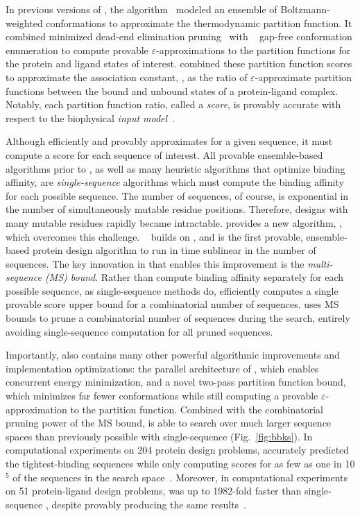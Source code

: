 \def\multisequencebound{MS\xspace}
\def\msbound{\multisequencebound}


\newcommand{\cut}[1]{}

In previous versions of \osprey, the \ks algorithm~\cite{K*} modeled an ensemble of Boltzmann-weighted conformations to approximate the thermodynamic partition function. It combined minimized dead-end elimination pruning~\cite{DEE} with \as~\cite{DEE,A*} gap-free conformation enumeration to compute provable $\varepsilon$-approximations to the partition functions for the protein and ligand states of interest. \ks combined these partition function scores to approximate the association constant, \ka, as the ratio of $\varepsilon$-approximate partition functions between the bound and unbound states of a protein-ligand complex. Notably, each partition function ratio, called a \ks \emph{score}, is provably accurate with respect to the biophysical \emph{input model}~\cite{K*,minDEE,iMinDEE}. 

Although \ks efficiently and provably approximates \ka for a given sequence, it must compute a \ks score for each sequence of interest. All provable ensemble-based algorithms prior to \bbks, as well as many heuristic algorithms that optimize binding affinity, are \emph{single-sequence} algorithms which must compute the binding affinity for each possible sequence. The number of sequences, of course, is exponential in the number of simultaneously mutable residue positions.  Therefore, designs with many mutable residues rapidly became intractable.  provides a new algorithm, \bbks, which overcomes this challenge. \bbks~\cite{BBK*} builds on \ks, and is the first provable, ensemble-based protein design algorithm to run in time sublinear in the number of sequences. The key innovation in \bbks that enables this improvement is the \emph{multi-sequence (\msbound) bound}. Rather than compute binding affinity separately for each possible sequence, as single-sequence methods do, \bbks efficiently computes a single provable \ks score upper bound for a combinatorial number of sequences. \bbks uses \msbound bounds to prune a combinatorial number of sequences during the search, entirely avoiding single-sequence computation for all pruned sequences.

Importantly, \bbks also contains many other powerful algorithmic improvements and implementation optimizations: the parallel architecture of \bbks, which enables concurrent energy minimization, and a novel two-pass partition function bound, which minimizes far fewer conformations while still computing a provable $\varepsilon$-approximation to the partition function. Combined with the combinatorial pruning power of the \msbound bound, \bbks is able to search over much larger sequence spaces than previously possible with single-sequence \ks (Fig.~\ref{fig:bbks}). In computational experiments on 204 protein design problems, \bbks accurately predicted the tightest-binding sequences while only computing \ks scores for as few as one in 10$^5$ of the sequences in the search space~\cite{BBK*}.  Moreover, in computational experiments on 51 protein-ligand design problems, \bbks was up to 1982-fold faster than single-sequence \ks, despite provably producing the same results~\cite{BBK*}.  

